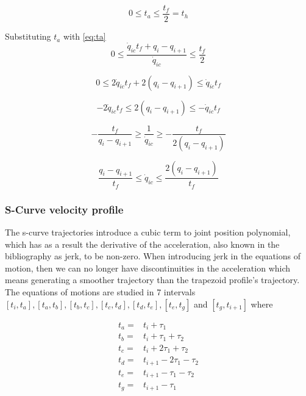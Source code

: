 \begin{equation}
0 \leq t_a \leq \frac{t_f}{2} = t_h
\end{equation}

Substituting $t_a$ with \ref{eq:ta}
\begin{equation}
0 \leq \frac{\dot{q}_{ic}t_f + q_i - q_{i+1}}{\dot{q}_{ic}} \leq \frac{t_f}{2}
\end{equation}

\begin{equation}
0 \leq 2\dot{q}_{ic}t_f + 2(q_i-q_{i+1}) \leq \dot{q}_{ic}t_f
\end{equation}

\begin{equation}
-2\dot{q}_{ic}t_f \leq 2(q_i - q_{i+1}) \leq -\dot{q}_{ic}t_f
\end{equation}

\begin{equation}
- \frac{t_f}{q_i - q_{i+1}} \geq \frac{1}{\dot{q}_{ic}} \geq -\frac{t_f}{2(q_i - q_{i+1})}
\end{equation}

\begin{equation}
\frac{q_i - q_{i+1}}{t_f} \leq \dot{q}_{ic} \leq \frac{2(q_i - q_{i+1})}{t_f}
\end{equation}


\subsubsection{S-Curve velocity profile}

The s-curve trajectories introduce a cubic term to joint position polynomial, which has as a result the derivative of the acceleration, also known in the bibliography as jerk, to be non-zero. When introducing jerk
in the equations of motion, then we can no longer have discontinuities in the acceleration which means generating a smoother trajectory than the trapezoid profile's trajectory. The equations of motions are studied 
in 7 intervals $[t_i, t_a], [t_a, t_b], [t_b, t_c], [t_c, t_d], [t_d, t_e], [t_e, t_g]$ and $[t_g, t_{i+1}]$ where 

\begin{equation}
\begin{aligned}
t_a ={}& t_i + τ_1 \\
t_b ={}& t_i + τ_1 + τ_2 \\
t_c ={}& t_i + 2τ_1 + τ_2 \\
t_d ={}& t_{i+1} - 2τ_1 - τ_2 \\
t_e ={}& t_{i+1} - τ_1 - τ_2 \\
t_g ={}& t_{i+1} - τ_1 \\
\end{aligned}
\end{equation}

